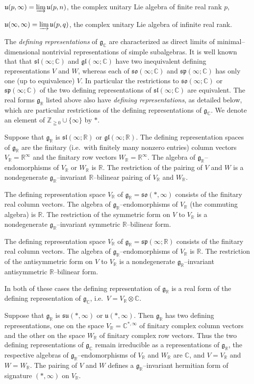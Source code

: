 \documentclass[oneside,leqno,11pt]{article}
\def\gg{\mathfrak{g}}
\def\ggl{\mathfrak{gl}}
\def\gsl{\mathfrak{sl}}
\def\gso{\mathfrak{so}}
\def\gsu{\mathfrak{su}}
\def\gsp{\mathfrak{sp}}
\def\gu{\mathfrak{u}}
\def\C{\mathbb{C}}
\def\R{\mathbb{R}}
\def\Z{\mathbb{Z}}
\begin{document}
$\gu(p,\infty) = \varinjlim \gu(p,n)$, the complex unitary
Lie algebra of finite real rank $p$,

$\gu(\infty,\infty) = \varinjlim \gu(p,q)$, the complex
unitary Lie algebra of infinite real rank.
\medskip

The \emph{defining representations} of $\gg_\C$ are characterized as direct limits of minimal--dimensional nontrivial representations of simple subalgebras.  It is well known that that $\gsl(\infty;\C)$ and $\ggl(\infty;\C)$ have two inequivalent defining representations $V$ and $W$, whereas each of $\gso (\infty;\C)$ and $\gsp(\infty;\C)$ has only one (up to equivalence) $V$.  In particular 
the restrictions to $\gso(\infty;\C)$ or $\gsp(\infty;\C)$ of the two defining 
representations of $\gsl(\infty;\C)$ are equivalent.
The real forms $\gg_\R$ listed above also have \emph{defining representations}, as detailed below, which are particular restrictions of the defining representations of $\gg_\C$.  
We denote an element of $\Z_{\geqq 0} \cup \{ \infty \}$ by $*$.

Suppose that $\gg_\R$ is $\gsl(\infty;\R)$ or $\ggl(\infty;\R)$.  The defining representation spaces of $\gg_\R$ are the finitary (i.e.\ with finitely many nonzero entries) column vectors $V_\R = \R^\infty$ and the finitary row vectors $W_\R = \R^\infty$.   The algebra of $\gg_\R$--endomorphisms of $V_\R$ or $W_\R$ is $\R$.  The restriction of the pairing of $V$ and $W$ is a nondegenerate $\gg_\R$--invariant $\R$--bilinear pairing of $V_\R$ and $W_\R$. 

The defining representation space $V_\R$ of $\gg_\R = \gso(*,\infty)$ 
consists of the finitary real column vectors.  
The algebra of $\gg_\R$--endomorphisms of $V_\R$ 
(the commuting algebra) is $\R$.  The restriction of the symmetric form on $V$ to $V_\R$ is a nondegenerate $\gg_\R$--invariant symmetric $\R$--bilinear form. 

The defining representation space $V_\R$ of $\gg_\R = \gsp(\infty;\R)$ 
consists of the finitary real column vectors.  The algebra of $\gg_\R$--endomorphisms of $V_\R$ is $\R$.  The restriction of the antisymmetric form on $V$ to $V_\R$ is a nondegenerate $\gg_\R$--invariant antisymmetric $\R$--bilinear form.  

In both of these cases the defining representation of $\gg_\R$ is a real form of the defining representation of $\gg_\C$, i.e.\ $V = V_\R \otimes \C$.

Suppose that $\gg_\R$ is $\gsu(*,\infty)$ or $\gu(*,\infty)$.  Then $\gg_\R$ has 
two defining representations, one on the space $V_\R = \C^{*,\infty}$
of finitary complex column vectors and the other on the space
$W_\R$ of finitary complex row vectors.  Thus the two 
defining representations of $\gg_\C$ remain irreducible as a representations
of $\gg_\R$,
the respective algebras of $\gg_\R$--endomorphisms of $V_\R$ and $W_\R$ 
are $\C$, and $V = V_\R$ and $W = W_\R$.  The pairing of $V$ and $W$ defines
a $\gg_\R$--invariant hermitian form of signature $(*,\infty)$ on $V_\R$.  
\end{document}
